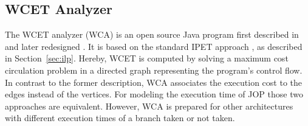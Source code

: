 %
%






\subsection{WCET Analyzer}

The WCET analyzer (WCA) is an open source Java program first
described in \cite{jop:wcet:jtres06} and later redesigned
\cite{master:huber:2009}. It is based on the standard IPET approach
\cite{Puschner:JRTS1997}, as described in Section~\ref{sec:ilp}.
Hereby, WCET is computed by solving a maximum cost circulation
problem in a directed graph representing the program's control flow.
In contrast to the former description, WCA associates the execution
cost to the edges instead of the vertices. For modeling the execution
time of JOP those two approaches are equivalent. However, WCA is
prepared for other architectures with different execution times of a
branch taken or not taken.

